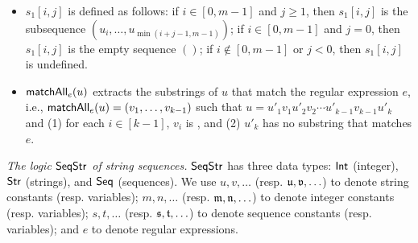 \begin{itemize}
	\item $s_1[i, j]$ is defined as follows: if $i\in [0,m-1]$ and $j \ge 1$, then $s_1[i, j]$ is  the subsequence $(u_i, \ldots, u_{\min(i+j-1,m-1)})$; if $i\in [0,m-1]$ and $j = 0$, then $s_1[i, j]$ is the empty sequence $()$;  if $i\not\in [0,m-1]$ or $j < 0$, then $s_1[i, j]$ is undefined. 

	\item $\mathsf{matchAll}_e(u)$ extracts the substrings of $u$ that match the regular expression $e$, 
	 i.e., $\mathsf{matchAll}_e(u) = (v_1, \ldots, v_{k-1})$ such that $u = u'_1 v_1 u'_2 v_2 \cdots u'_{k-1}v_{k-1} u'_k$ and (1) for each $i \in [k-1]$, $v_i$ is , and (2) $u'_k$ has no substring that matches $e$.

\end{itemize}


\smallskip
\noindent\emph{The logic ${\sf SeqStr}$ of string sequences.} ${\sf SeqStr}$   
has three data types: ${\sf Int}$ (integer), ${\sf Str}$ (strings), and ${\sf Seq}$ (sequences).
%
We use $u, v, \ldots$ (resp. $\mathfrak{u}, \mathfrak{v}, \ldots$) to denote string constants (resp. variables); $m,n, \ldots$ (resp. $\mathfrak{m}, \mathfrak{n}, \ldots$) to denote integer constants (resp. variables);
$s, t, \ldots$ (resp. $\mathfrak{s},\mathfrak{t}, \ldots$) to denote sequence constants (resp. variables); and $e$ to denote regular expressions.

